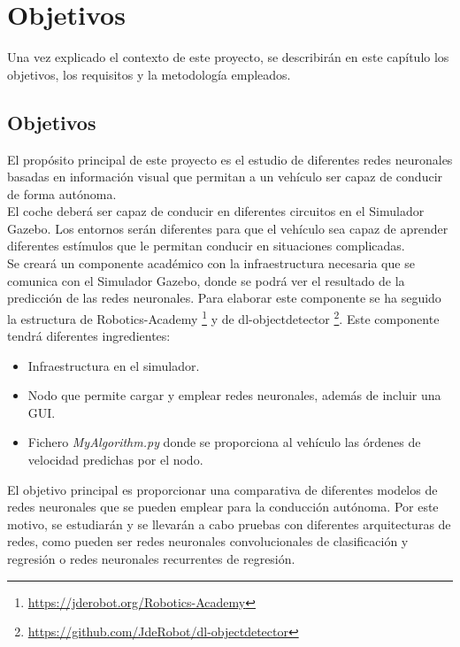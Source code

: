 \chapter{Objetivos}\label{cap.objetivos}

Una vez explicado el contexto de este proyecto, se describirán en este capítulo los objetivos, los requisitos y la metodología empleados.

\section{Objetivos}

El propósito principal de este proyecto es el estudio de diferentes redes neuronales basadas en información visual que permitan a un vehículo ser capaz de conducir de forma autónoma.\\

El coche deberá ser capaz de conducir en diferentes circuitos en el Simulador Gazebo. Los entornos serán diferentes para que el vehículo sea capaz de aprender diferentes estímulos que le permitan conducir en situaciones complicadas.\\

Se creará un componente académico con la infraestructura necesaria que se comunica con el Simulador Gazebo, donde se podrá ver el resultado de la predicción de las redes neuronales. Para elaborar este componente se ha seguido la estructura de Robotics-Academy \footnote{\url{https://jderobot.org/Robotics-Academy}} y de dl-objectdetector \footnote{\url{https://github.com/JdeRobot/dl-objectdetector}}. Este componente tendrá diferentes ingredientes: 

\begin{itemize}
    \item Infraestructura en el simulador.
    \item Nodo que permite cargar y emplear redes neuronales, además de incluir una GUI.
    \item Fichero \textit{MyAlgorithm.py} donde se proporciona al vehículo las órdenes de velocidad predichas por el nodo.
\end{itemize}

El objetivo principal es proporcionar una comparativa de diferentes modelos de redes neuronales que se pueden emplear para la conducción autónoma. Por este motivo, se estudiarán y se llevarán a cabo pruebas con diferentes arquitecturas de redes, como pueden ser redes neuronales convolucionales de clasificación y regresión o redes neuronales recurrentes de regresión. 

